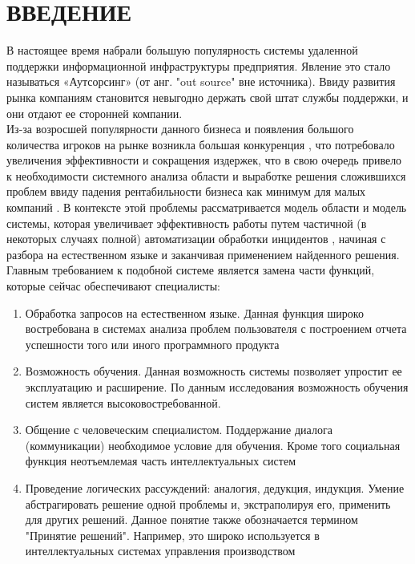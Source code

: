 \chapter*{ВВЕДЕНИЕ}							%

В настоящее время набрали большую популярность системы удаленной поддержки информационной инфраструктуры предприятия. Явление это стало называться «Аутсорсинг» (от анг. "out source" \- вне источника). Ввиду развития рынка компаниям становится невыгодно держать свой штат службы поддержки, и они отдают ее сторонней компании. \\
Из-за возросшей популярности данного бизнеса и появления большого количества игроков на рынке возникла большая конкуренция \cite{AUTOS-1}, что потребовало увеличения эффективности и сокращения издержек, что в свою очередь привело к необходимости системного анализа области и выработке решения сложившихся проблем \cite{AUTOM-1} ввиду падения рентабильности бизнеса как минимум для малых компаний \cite{OUTSOURCE-RENT}. В контексте этой проблемы рассматривается модель области и модель системы, которая увеличивает эффективность работы путем частичной (в некоторых случаях полной) автоматизации обработки инцидентов \cite{SDAUTOM}, начиная с разбора на естественном языке и заканчивая применением найденного решения. \\
Главным требованием к подобной системе является замена части функций, которые сейчас обеспечивают специалисты:
\begin{enumerate}
  \item Обработка запросов на естественном языке. Данная функция широко востребована в системах анализа проблем пользователя с построением отчета успешности того или иного программного продукта \cite{TUTUB-1}
  \item Возможность обучения. Данная возможность системы позволяет упростит ее эксплуатацию и расширение. По данным исследования \cite{LEARN-1} возможность обучения систем является высоковостребованной.
  \item Общение с человеческим специалистом. Поддержание диалога (коммуникации) необходимое условие для обучения. Кроме того социальная функция неотъемлемая часть интеллектуальных систем \cite{LEARN-2}
  \item Проведение логических рассуждений: аналогия, дедукция, индукция. Умение абстрагировать решение одной проблемы и, экстраполируя его, применить для других решений. Данное понятие также обозначается термином "Принятие решений". Например, это широко используется в интеллектуальных системах управления производством \cite{LEARN-3}
\end{enumerate}

